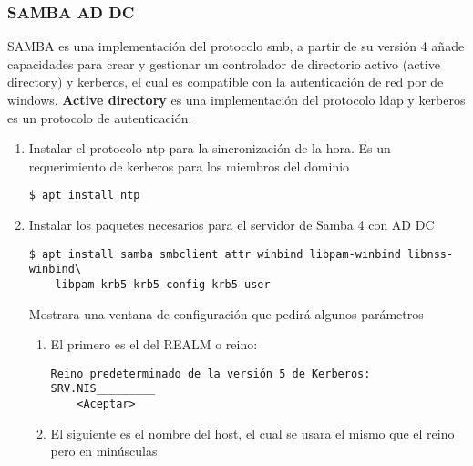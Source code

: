 \documentclass[../main.tex]{subfiles}
\begin{document}
\subsubsection{SAMBA AD DC}\label{sec:samba_addc}

\Gls{SAMBA} es una implementación del protocolo smb, a partir de su
versión 4 añade capacidades para crear y gestionar un controlador
de directorio activo (active directory) y kerberos, el cual es
compatible con la autenticación de red por de windows. \textbf{Active
directory} es una implementación del protocolo \Gls{ldap} y \Gls{kerberos}
es un protocolo de autenticación.

\begin{enumerate}
  \item Instalar el protocolo \Gls{ntp} para la sincronización de la hora.
        Es un requerimiento de \Gls{kerberos} para los miembros del dominio

        \begin{listing}[H]
\begin{verbatim}
$ apt install ntp
\end{verbatim}
\end{listing}

  \item Instalar los paquetes necesarios para el servidor de
        Samba 4 con AD DC

        \begin{listing}[H]
\begin{verbatim}
$ apt install samba smbclient attr winbind libpam-winbind libnss-winbind\
    libpam-krb5 krb5-config krb5-user
\end{verbatim}
\end{listing}

        Mostrara una ventana de configuración que pedirá algunos parámetros

        \begin{enumerate}
          \item El primero es el del REALM o reino:

                \begin{listing}[H]
\begin{verbatim}
Reino predeterminado de la versión 5 de Kerberos:
SRV.NIS_________
    <Aceptar>
\end{verbatim}
\end{listing}


          \item El siguiente es el nombre del host, el cual se usara el mismo
                que el reino pero en minúsculas


\end{enumerate}
\end{enumerate}
\end{document}
